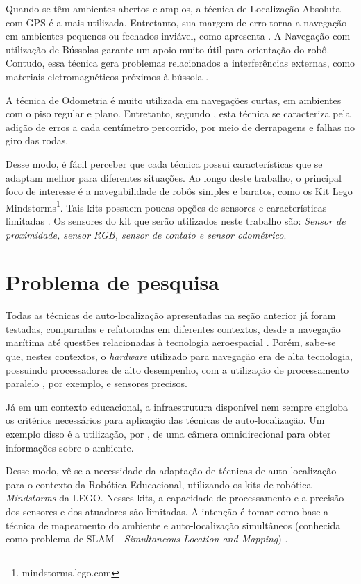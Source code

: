 	Quando se têm ambientes abertos e amplos, a técnica de Localização Absoluta com GPS é a mais utilizada. Entretanto, sua margem de erro torna a navegação em ambientes pequenos ou fechados inviável, como apresenta \cite{roboBulldozerIV}. A Navegação com utilização de Bússolas garante um apoio muito útil para orientação do robô. Contudo, essa técnica gera problemas relacionados a interferências externas, como materiais eletromagnéticos próximos à bússola \cite{roboBulldozerIV}.
	
	A técnica de Odometria é muito utilizada em navegações curtas, em ambientes com o piso regular e plano. Entretanto, segundo \cite{roboBulldozerIV}, esta técnica se caracteriza pela adição de erros a cada centímetro percorrido, por meio de derrapagens e falhas no giro das rodas. 

	Desse modo, é fácil perceber que cada técnica possui características que se adaptam melhor para diferentes situações. Ao longo deste trabalho, o principal foco de interesse é a navegabilidade de robôs simples e baratos, como os Kit Lego Mindstorms\footnote{mindstorms.lego.com}. Tais kits possuem poucas opções de sensores e características limitadas \cite{drawLegoRobot}. Os sensores do kit que serão utilizados neste trabalho são: \textit{Sensor de proximidade, sensor RGB, sensor de contato e sensor odométrico}.

\section{Problema de pesquisa}

	Todas as técnicas de auto-localização apresentadas na seção anterior já foram testadas, comparadas e refatoradas em diferentes contextos, desde a navegação marítima até questões relacionadas à tecnologia aeroespacial \cite{localizacaoEMapeamentoPaulo}. Porém, sabe-se que, nestes contextos, o \textit{hardware} utilizado para navegação era de alta tecnologia, possuindo processadores de alto desempenho, com a utilização de processamento paralelo \cite{processamentoParalelo}, por exemplo, e sensores precisos.

	Já em um contexto educacional, a infraestrutura disponível nem sempre engloba os critérios necessários para aplicação das técnicas de auto-localização. Um exemplo disso é a utilização, por \cite{localizacaoEMapeamentoPaulo}, de uma câmera omnidirecional para obter informações sobre o ambiente.

	Desse modo, vê-se a necessidade da adaptação de técnicas de auto-localização para o contexto da Robótica Educacional, utilizando os kits de robótica \textit{Mindstorms} da LEGO. Nesses kits, a capacidade de processamento e a precisão dos sensores e dos atuadores são limitadas. A intenção é tomar como base a técnica de mapeamento do ambiente e auto-localização simultâneos (conhecida como problema de SLAM - \textit{Simultaneous Location and Mapping}) \cite{slamProblem}.

